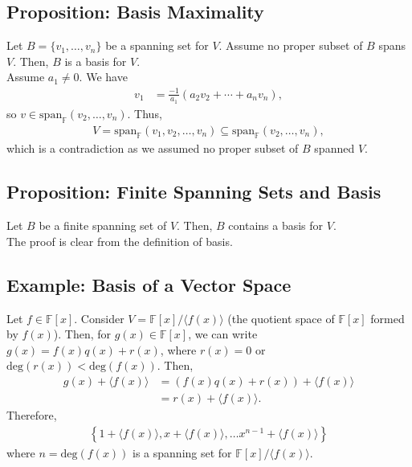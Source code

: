 \documentclass[8pt]{extarticle}
\begin{document}
  \subsection{Proposition: Basis Maximality}%
  Let $B = \{v_1,\dots,v_n\}$ be a spanning set for $V$. Assume no proper subset of $B$ spans $V$. Then, $B$ is a basis for $V$.\\

  Assume $a_1\neq 0$. We have
  \begin{align*}
    v_1 &= \frac{-1}{a_1}\left(a_2v_2 + \cdots + a_nv_n\right),
  \end{align*}
  so $v\in \text{span}_{\mathbb{F}}(v_2,\dots,v_n)$. Thus,
  \begin{align*}
    V = \text{span}_{\mathbb{F}}\left(v_1,v_2,\dots,v_n\right) \subseteq \text{span}_{\mathbb{F}}(v_2,\dots,v_n),
  \end{align*}
  which is a contradiction as we assumed no proper subset of $B$ spanned $V$.
  \subsection{Proposition: Finite Spanning Sets and Basis}%
  Let $B$ be a finite spanning set of $V$. Then, $B$ contains a basis for $V$.\\

  The proof is clear from the definition of basis.
  \subsection{Example: Basis of a Vector Space}%
  Let $f\in \mathbb{F}[x]$. Consider $V = \mathbb{F}[x]/\langle f(x)\rangle$ (the quotient space of $\mathbb{F}[x]$ formed by $f(x)$). Then, for $g(x)\in \mathbb{F}[x]$, we can write $g(x) = f(x)q(x) + r(x)$, where $r(x) = 0$ or $\text{deg}(r(x)) < \text{deg}(f(x))$. Then,
  \begin{align*}
    g(x) + \langle f(x) \rangle &= \left(f(x)q(x) + r(x)\right) + \langle f(x) \rangle\\
                                &= r(x) + \langle f(x) \rangle.
  \end{align*}
  Therefore,
  \begin{align*}
    \left\{1 + \langle f(x) \rangle, x + \langle f(x) \rangle, \dots x^{n-1} + \langle f(x) \rangle \right\}
  \end{align*}
  where $n = \text{deg}(f(x))$ is a spanning set for $\mathbb{F}[x]/\langle f(x)\rangle$.\\
\end{document}
